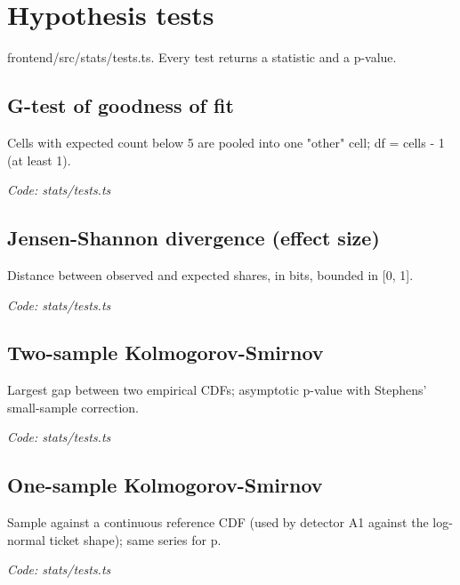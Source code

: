 \documentclass[11pt,a4paper]{article}
\newcommand{\where}[1]{\par{\small\itshape\color{mute}Code: #1}\par}
\begin{document}
\clearpage
\section{Hypothesis tests}
{\color{mute}frontend/src/stats/tests.ts. Every test returns a statistic and a p-value.}

\subsection*{G-test of goodness of fit}
\par\smallskip\noindent{}\par\smallskip
Cells with expected count below 5 are pooled into one "other" cell; df = cells - 1 (at least 1).
\where{stats/tests.ts}

\subsection*{Jensen-Shannon divergence (effect size)}
\par\smallskip\noindent{}\par\smallskip
Distance between observed and expected shares, in bits, bounded in [0, 1].
\where{stats/tests.ts}

\subsection*{Two-sample Kolmogorov-Smirnov}
\par\smallskip\noindent{}\par\smallskip
\par\smallskip\noindent{}\par\smallskip
Largest gap between two empirical CDFs; asymptotic p-value with Stephens' small-sample correction.
\where{stats/tests.ts}

\subsection*{One-sample Kolmogorov-Smirnov}
\par\smallskip\noindent{}\par\smallskip
Sample against a continuous reference CDF (used by detector A1 against the log-normal ticket shape); same series for p.
\where{stats/tests.ts}
\end{document}

